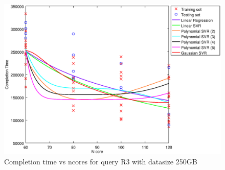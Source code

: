 
\begin {figure}[hbtp]
\centering
\includegraphics[width=\textwidth]{output/R3_250_ONLY_1_OVER_NCORES/plot_R3_250.eps}
\caption{Completion time vs ncores for query R3 with datasize 250GB}
\label{fig:all_nonlinear_R3_250}
\end {figure}

